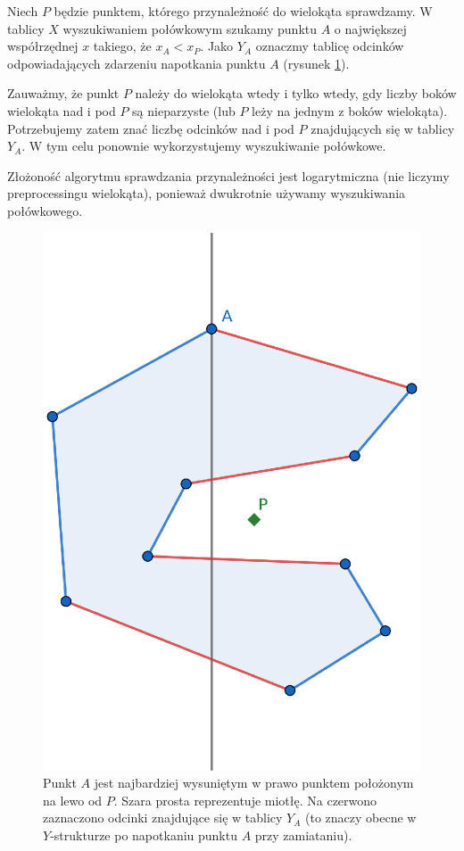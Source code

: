 Niech $P$ będzie punktem, którego przynależność do wielokąta sprawdzamy. W tablicy $X$ wyszukiwaniem połówkowym szukamy punktu $A$ o największej współrzędnej $x$ takiego, że $x_A < x_P$. Jako $Y_A$ oznaczmy tablicę odcinków odpowiadających zdarzeniu napotkania punktu $A$ (rysunek \ref{fig:zad73}). 

Zauważmy, że punkt $P$ należy do wielokąta wtedy i tylko wtedy, gdy liczby boków wielokąta nad i pod $P$ są nieparzyste (lub $P$ leży na jednym z boków wielokąta). Potrzebujemy zatem znać liczbę odcinków nad i pod $P$ znajdujących się w tablicy $Y_A$. W tym celu ponownie wykorzystujemy wyszukiwanie połówkowe.

Złożoność algorytmu sprawdzania przynależności jest logarytmiczna (nie liczymy preprocessingu wielokąta), ponieważ dwukrotnie używamy wyszukiwania połówkowego.

\begin{figure}[H]
	\centering
	\includegraphics[height=0.45\linewidth]{data/zad73.eps}
	\caption{Punkt $A$ jest najbardziej wysuniętym w prawo punktem położonym na lewo od $P$. Szara prosta reprezentuje miotłę. Na czerwono zaznaczono odcinki znajdujące się w tablicy $Y_A$ (to znaczy obecne w $Y$-strukturze po napotkaniu punktu $A$ przy zamiataniu).}	
	\label{fig:zad73}
\end{figure}


